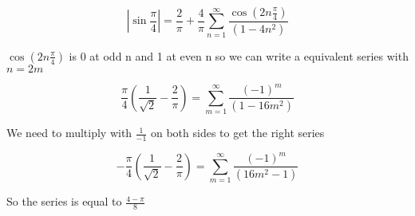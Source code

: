 \documentclass[a4paper]{article}
\begin{document}
\begin{equation}
    |\sin{\frac{\pi}{4}}| = \frac{2}{\pi} + \frac{4}{\pi} \sum_{n=1}^\infty \frac{\cos{(2n\frac{\pi}{4})}}{(1-4n^2)}
\end{equation}

$\cos{(2n\frac{\pi}{4})}$ is 0 at odd n and 1 at even n so we can write a equivalent series with $n=2m$

\begin{equation}
    \frac{\pi}{4}(\frac{1}{\sqrt{2}} - \frac{2}{\pi}) = \sum_{m=1}^\infty \frac{(-1)^m}{(1-16m^2)}
\end{equation}

We need to multiply with $\frac{1}{-1}$ on both sides to get the right series

\begin{equation}
    -\frac{\pi}{4}(\frac{1}{\sqrt{2}} - \frac{2}{\pi}) = \sum_{m=1}^\infty \frac{(-1)^m}{(16m^2-1)}
\end{equation}

So the series is equal to $\frac{4 - \pi}{8}$
\end{document}
